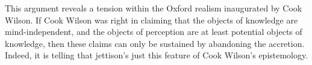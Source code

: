 \documentclass[12pt]{article}
\begin{document}
This argument reveals a tension within the Oxford realism inaugurated by Cook Wilson. If Cook Wilson was right in claiming that the objects of knowledge are mind-independent, and the objects of perception are at least potential objects of knowledge, then these claims can only be sustained by abandoning the accretion. Indeed, it is telling that \citet{Austin:1962lr} jettison's just this feature of Cook Wilson's epistemology. 
\end{document}
